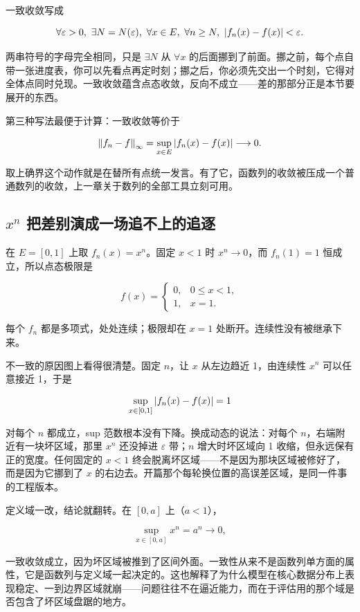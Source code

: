 一致收敛写成

\[
\forall\varepsilon>0,\ \exists N=N(\varepsilon),\ \forall x\in E,\ \forall n\ge N,\ \abs{f_n(x)-f(x)}<\varepsilon.
\]

两串符号的字母完全相同，只是 \(\exists N\) 从 \(\forall x\) 的后面挪到了前面。挪之前，每个点自带一张进度表，你可以先看点再定时刻；挪之后，你必须先交出一个时刻，它得对全体点同时兑现。一致收敛蕴含点态收敛，反向不成立——差的那部分正是本节要展开的东西。

第三种写法最便于计算：一致收敛等价于

\[
\left\lVert f_n-f\right\rVert_\infty = \sup_{x\in E}\left|f_n(x)-f(x)\right| \longrightarrow 0.
\]

取上确界这个动作就是在替所有点统一发言。有了它，函数列的收敛被压成一个普通数列的收敛，上一章关于数列的全部工具立刻可用。

\subsection{\(x^n\) 把差别演成一场追不上的追逐}

在 \(E=[0,1]\) 上取 \(f_n(x)=x^n\)。固定 \(x<1\) 时 \(x^n\to0\)，而 \(f_n(1)=1\) 恒成立，所以点态极限是

\[
f(x)=
\begin{cases}
0, & 0\le x<1,\\[2pt]
1, & x=1.
\end{cases}
\]

每个 \(f_n\) 都是多项式，处处连续；极限却在 \(x=1\) 处断开。连续性没有被继承下来。

不一致的原因图上看得很清楚。固定 \(n\)，让 \(x\) 从左边趋近 1，由连续性 \(x^n\) 可以任意接近 1，于是

\[
\sup_{x\in[0,1]}\left|f_n(x)-f(x)\right| = 1
\]

对每个 \(n\) 都成立，sup 范数根本没有下降。换成动态的说法：对每个 \(n\)，右端附近有一块坏区域，那里 \(x^n\) 还没掉进 \(\varepsilon\) 带；\(n\) 增大时坏区域向 1 收缩，但永远保有正的宽度。任何固定的 \(x<1\) 终会脱离坏区域——不是因为那块区域被修好了，而是因为它挪到了 \(x\) 的右边去。开篇那个每轮换位置的高误差区域，是同一件事的工程版本。

定义域一改，结论就翻转。在 \([0,a]\) 上（\(a<1\)），

\[
\sup_{x\in[0,a]} x^n = a^n \to 0,
\]

一致收敛成立，因为坏区域被推到了区间外面。一致性从来不是函数列单方面的属性，它是函数列与定义域一起决定的。这也解释了为什么模型在核心数据分布上表现稳定、一到边界区域就崩——问题往往不在逼近能力，而在于评估用的那个域是否包含了坏区域盘踞的地方。

